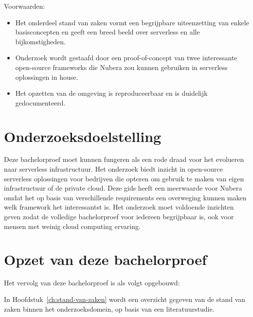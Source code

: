 Voorwaarden: 
\begin{itemize}
    \item Het onderdeel stand van zaken vormt een begrijpbare uiteenzetting van enkele basisconcepten en geeft een breed beeld over serverless en alle bijkomstigheden.
    \item Onderzoek wordt gestaafd door een proof-of-concept van  twee interessante open-source frameworks die  Nubera zou kunnen gebruiken in serverless oplossingen in house.
    \item Het opzetten van de omgeving is reproduceerbaar en is duidelijk gedocumenteerd.
\end{itemize}



\section{Onderzoeksdoelstelling}
\label{sec:onderzoeksdoelstelling}

Deze bachelorproef moet kunnen fungeren als een rode draad voor het evolueren naar serverless infrastructuur. Het onderzoek biedt inzicht in open-source serverless oplossingen voor bedrijven die opteren om gebruik te maken van eigen infrastructuur of de private cloud. Deze gids heeft een meerwaarde voor Nubera omdat het op basis van verschillende requirements een overweging kunnen maken welk framework het interessantst is. Het onderzoek moet voldoende inzichten geven zodat de volledige bachelorproef voor iedereen begrijpbaar is, ook voor mensen met weinig cloud computing ervaring.


\section{Opzet van deze bachelorproef}
\label{sec:opzet-bachelorproef}


Het vervolg van deze bachelorproef is als volgt opgebouwd:

In Hoofdstuk~\ref{ch:stand-van-zaken} wordt een overzicht gegeven van de stand van zaken binnen het onderzoeksdomein, op basis van een literatuurstudie.

